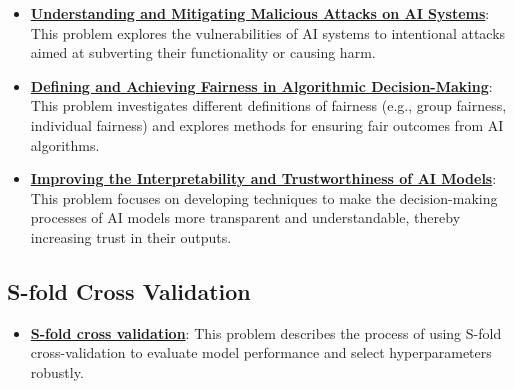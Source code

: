 \documentclass{article}%
\begin{document}
\begin{itemize}[leftmargin=*]
\item \href{https://purdue.brightspace.com/d2l/common/assets/pdfjs-d2l-dist/1.0.14-legacy/web/viewer.html?file=\%2Fcontent\%2Fenforced\%2F1095467-wl.202510.CS.24300.001\%2F16L2-ethics.pdf\%3Fou\%3D1095467\&lang=en-us\&container=d2l-fileviewer-rendered-pdf\&fullscreen=d2l-fileviewer-rendered-pdf-dialog\&height=667#page=9}{\textbf{Understanding and Mitigating Malicious Attacks on AI Systems}}: This problem explores the vulnerabilities of AI systems to intentional attacks aimed at subverting their functionality or causing harm.%
\item \href{https://purdue.brightspace.com/d2l/common/assets/pdfjs-d2l-dist/1.0.14-legacy/web/viewer.html?file=\%2Fcontent\%2Fenforced\%2F1095467-wl.202510.CS.24300.001\%2F16L2-ethics.pdf\%3Fou\%3D1095467\&lang=en-us\&container=d2l-fileviewer-rendered-pdf\&fullscreen=d2l-fileviewer-rendered-pdf-dialog\&height=667#page=26}{\textbf{Defining and Achieving Fairness in Algorithmic Decision-Making}}: This problem investigates different definitions of fairness (e.g., group fairness, individual fairness) and explores methods for ensuring fair outcomes from AI algorithms.%
\item \href{https://purdue.brightspace.com/d2l/common/assets/pdfjs-d2l-dist/1.0.14-legacy/web/viewer.html?file=\%2Fcontent\%2Fenforced\%2F1095467-wl.202510.CS.24300.001\%2F16L2-ethics.pdf\%3Fou\%3D1095467\&lang=en-us\&container=d2l-fileviewer-rendered-pdf\&fullscreen=d2l-fileviewer-rendered-pdf-dialog\&height=667#page=28}{\textbf{Improving the Interpretability and Trustworthiness of AI Models}}: This problem focuses on developing techniques to make the decision-making processes of AI models more transparent and understandable, thereby increasing trust in their outputs.%
\end{itemize}

%
\subsection{S{-}fold Cross Validation}%
\label{subsec:S{-}foldCrossValidation}%
\begin{itemize}[leftmargin=*]%
\item \href{https://purdue.brightspace.com/d2l/common/assets/pdfjs-d2l-dist/1.0.14-legacy/web/viewer.html?file=\%2Fcontent\%2Fenforced\%2F1095467-wl.202510.CS.24300.001\%2F10L1-CrossValidation.pdf\%3Fou\%3D1095467\&lang=en-us\&container=d2l-fileviewer-rendered-pdf\&fullscreen=d2l-fileviewer-rendered-pdf-dialog\&height=667#page=25}{\textbf{S-fold cross validation}}: This problem describes the process of using S-fold cross-validation to evaluate model performance and select hyperparameters robustly.%
\end{itemize}
\end{document}
